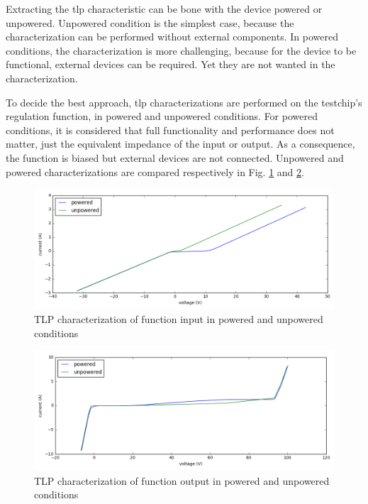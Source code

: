 Extracting the \gls{tlp} characteristic can be bone with the device powered or unpowered.
Unpowered condition is the simplest case, because the characterization can be performed without external components.
In powered conditions, the characterization is more challenging, because for the device to be functional, external devices can be required.
Yet they are not wanted in the characterization.

To decide the best approach, \gls{tlp} characterizations are performed on the testchip's regulation function, in powered and unpowered conditions.
For powered conditions, it is considered that full functionality and performance does not matter, just the equivalent impedance of the input or output.
As a consequence, the function is biased but external devices are not connected.
Unpowered and powered characterizations are compared respectively in Fig. \ref{fig:tlp-input-cz} and \ref{fig:tlp-output-cz}.

\begin{figure}[!h]
  \centering
  \includegraphics[width=\textwidth]{src/4/figures/tlp_input_characterization.png}
  \caption{TLP characterization of function input in powered and unpowered conditions}
  \label{fig:tlp-input-cz}
\end{figure}

\begin{figure}[!h]
  \centering
  \includegraphics[width=\textwidth]{src/4/figures/tlp_output_characterization.png}
  \caption{TLP characterization of function output in powered and unpowered conditions}
  \label{fig:tlp-output-cz}
\end{figure}

